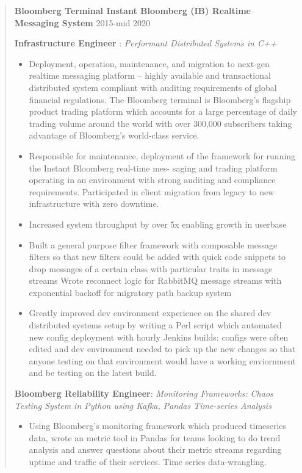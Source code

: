 \documentclass[11pt,a4paper]{article}
\begin{document}
\begin{quote}
\textbf{Bloomberg Terminal Instant Bloomberg (IB) Realtime Messaging
System} 2015-mid 2020

\textbf{Infrastructure Engineer} : \emph{Performant Distributed Systems
in C++}
\begin{itemize}
\item Deployment, operation, maintenance, and migration to next-gen realtime
messaging platform -- highly available and transactional distributed
system compliant with auditing requirements of global financial
regulations. The Bloomberg terminal is Bloomberg's flagship product
trading platform which accounts for a large percentage of daily trading
volume around the world with over 300,000 subscribers taking advantage
of Bloomberg's world-class service.

\item Responsible for maintenance, deployment of the framework for running the
Instant Bloomberg real-time mes- saging and trading platform operating
in an environment with strong auditing and compliance requirements.
Participated in client migration from legacy to new infrastructure with
zero downtime.

\item Increased system throughput by over 5x enabling growth in userbase
\item Built a general purpose filter framework with composable message filters
so that new filters could be added with quick code snippets to drop
messages of a certain class with particular traits in message streams
Wrote reconnect logic for RabbitMQ message streams with exponential
backoff for migratory path backup system
\item Greatly improved dev environment experience on the shared dev
distributed systems setup by writing a Perl script which automated new
config deployment with hourly Jenkins builds: configs were often edited
and dev environment needed to pick up the new changes so that anyone
testing on that environment would have a working enviornment and be
testing on the latest build.
\end{itemize}

\textbf{Bloomberg Reliability Engineer}:
\emph{Monitoring Frameworks: Chaos Testing System in Python using Kafka,
Pandas Time-series Analysis}
\begin{itemize}
\item Using Bloomberg's monitoring framework which produced timeseries data,
wrote an metric tool in Pandas for teams looking to do trend analysis
and answer questions about their metric streams regarding uptime and
traffic of their services. Time series data-wrangling.


\end{itemize}
\end{quote}
\end{document}

